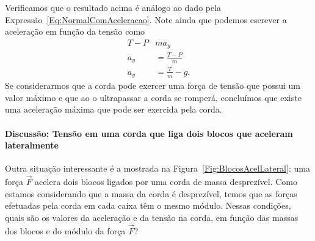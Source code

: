 \noindent{}Verificamos que o resultado acima é análogo ao dado pela Expressão~\eqref{Eq:NormalComAceleracao}. Note ainda que podemos escrever a aceleração em função da tensão como
\begin{align}
    T - P & m a_y \\
    a_y &= \frac{T - P}{m} \\
    a_y &= \frac{T}{m} - g.
\end{align}
%
Se considerarmos que a corda pode exercer uma força de tensão que possui um valor máximo e que ao o ultrapassar a corda se romperá, concluímos que existe uma aceleração máxima que pode ser exercida pela corda. 

\paragraph{Discussão: Tensão em uma corda que liga dois blocos que aceleram lateralmente}
\label{Par:Discussao:TensaoEmCordaQueLigaDoisBlocos}

Outra situação interessante é a mostrada na Figura~\ref{Fig:BlocosAcelLateral}: uma força $\vec{F}$ acelera dois blocos ligados por uma corda de massa desprezível. Como estamos considerando que a massa da corda é desprezível, temos que as forças efetuadas pela corda em cada caixa têm o mesmo módulo. Nessas condições, quais são os valores da aceleração e da tensão na corda, em função das massas dos blocos e do módulo da força $\vec{F}$?

